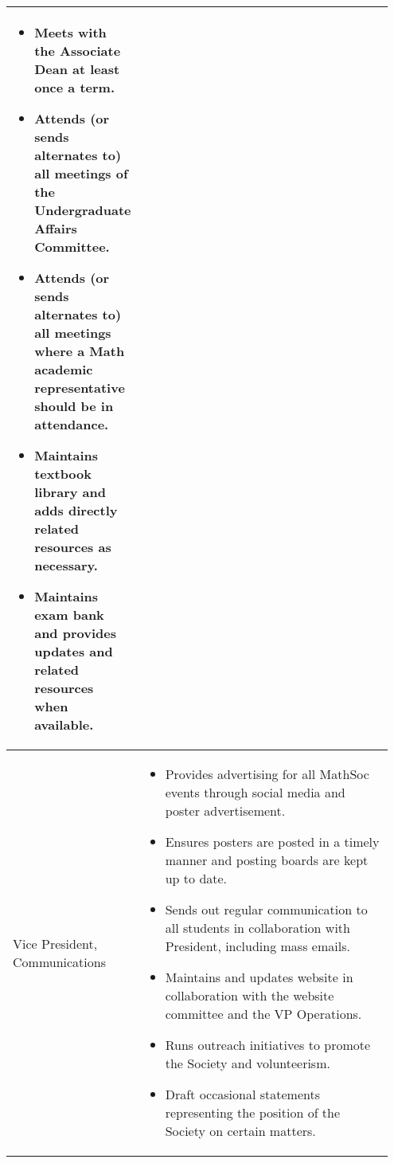 \begin{longtable}{p{0.2\linewidth} p{0.75\linewidth}}
\begin{itemize}
\item Meets with the Associate Dean at least once a term.
\item Attends (or sends alternates to) all meetings of the Undergraduate Affairs Committee.
\item Attends (or sends alternates to) all meetings where a Math academic representative should be in attendance.
\item Maintains textbook library and adds directly related resources as necessary.
\item Maintains exam bank and provides updates and related resources when available.
\end{itemize}
\\
\midrule
Vice President, Communications &
\begin{itemize}
\item Provides advertising for all MathSoc events through social media and poster advertisement.
\item Ensures posters are posted in a timely manner and posting boards are kept up to date.
\item Sends out regular communication to all students in collaboration with President, including mass emails.
\item Maintains and updates website in collaboration with the website committee and the VP Operations.
\item Runs outreach initiatives to promote the Society and volunteerism.
\item Draft occasional statements representing the position of the Society on certain matters.
\end{itemize}
\\
\bottomrule
\end{longtable}
